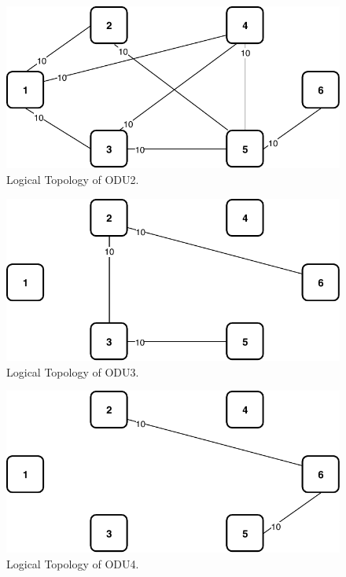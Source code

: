 \begin{figure}[h!]
\centering
\includegraphics[width=12cm]{sdf/ilp/opaque_survivability/figures/logical_topology_ODU2_medium}
\caption{Logical Topology of ODU2.}
\label{logical_ODU2_medium}
\end{figure}

\begin{figure}[h!]
\centering
\includegraphics[width=12cm]{sdf/ilp/opaque_survivability/figures/logical_topology_ODU3_medium}
\caption{Logical Topology of ODU3.}
\label{logical_ODU3_medium}
\end{figure}

\begin{figure}[h!]
\centering
\includegraphics[width=12cm]{sdf/ilp/opaque_survivability/figures/logical_topology_ODU4_medium}
\caption{Logical Topology of ODU4.}
\label{logical_ODU4_medium}
\end{figure}

